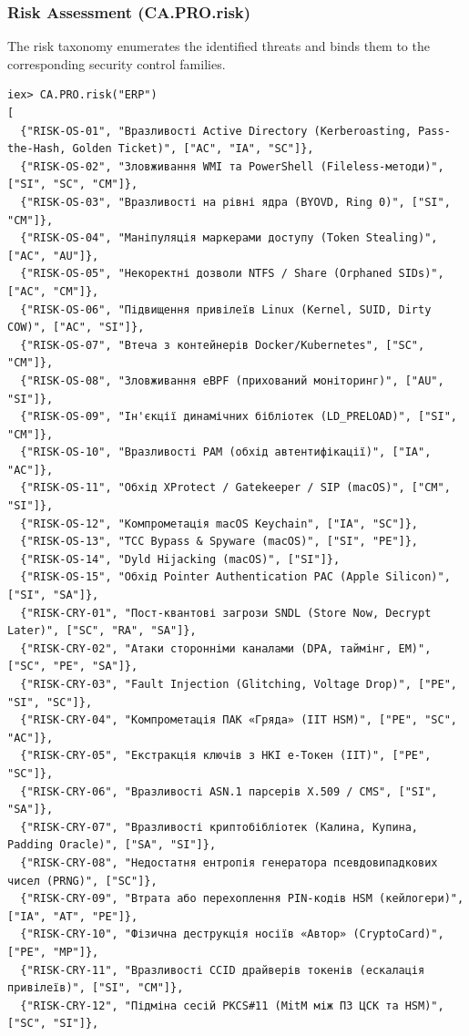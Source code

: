 \documentclass{article}
\begin{document}
\subsubsection{Risk Assessment (CA.PRO.risk)}
The risk taxonomy enumerates the identified threats and binds them to the corresponding security control families.
{\scriptsize
{}
\begin{verbatim}
iex> CA.PRO.risk("ERP")
[
  {"RISK-OS-01", "Вразливості Active Directory (Kerberoasting, Pass-the-Hash, Golden Ticket)", ["AC", "IA", "SC"]},
  {"RISK-OS-02", "Зловживання WMI та PowerShell (Fileless-методи)", ["SI", "SC", "CM"]},
  {"RISK-OS-03", "Вразливості на рівні ядра (BYOVD, Ring 0)", ["SI", "CM"]},
  {"RISK-OS-04", "Маніпуляція маркерами доступу (Token Stealing)", ["AC", "AU"]},
  {"RISK-OS-05", "Некоректні дозволи NTFS / Share (Orphaned SIDs)", ["AC", "CM"]},
  {"RISK-OS-06", "Підвищення привілеїв Linux (Kernel, SUID, Dirty COW)", ["AC", "SI"]},
  {"RISK-OS-07", "Втеча з контейнерів Docker/Kubernetes", ["SC", "CM"]},
  {"RISK-OS-08", "Зловживання eBPF (прихований моніторинг)", ["AU", "SI"]},
  {"RISK-OS-09", "Ін'єкції динамічних бібліотек (LD_PRELOAD)", ["SI", "CM"]},
  {"RISK-OS-10", "Вразливості PAM (обхід автентифікації)", ["IA", "AC"]},
  {"RISK-OS-11", "Обхід XProtect / Gatekeeper / SIP (macOS)", ["CM", "SI"]},
  {"RISK-OS-12", "Компрометація macOS Keychain", ["IA", "SC"]},
  {"RISK-OS-13", "TCC Bypass & Spyware (macOS)", ["SI", "PE"]},
  {"RISK-OS-14", "Dyld Hijacking (macOS)", ["SI"]},
  {"RISK-OS-15", "Обхід Pointer Authentication PAC (Apple Silicon)", ["SI", "SA"]},
  {"RISK-CRY-01", "Пост-квантові загрози SNDL (Store Now, Decrypt Later)", ["SC", "RA", "SA"]},
  {"RISK-CRY-02", "Атаки сторонніми каналами (DPA, таймінг, EM)", ["SC", "PE", "SA"]},
  {"RISK-CRY-03", "Fault Injection (Glitching, Voltage Drop)", ["PE", "SI", "SC"]},
  {"RISK-CRY-04", "Компрометація ПАК «Гряда» (ІІТ HSM)", ["PE", "SC", "AC"]},
  {"RISK-CRY-05", "Екстракція ключів з НКІ е-Токен (ІІТ)", ["PE", "SC"]},
  {"RISK-CRY-06", "Вразливості ASN.1 парсерів X.509 / CMS", ["SI", "SA"]},
  {"RISK-CRY-07", "Вразливості криптобібліотек (Калина, Купина, Padding Oracle)", ["SA", "SI"]},
  {"RISK-CRY-08", "Недостатня ентропія генератора псевдовипадкових чисел (PRNG)", ["SC"]},
  {"RISK-CRY-09", "Втрата або перехоплення PIN-кодів HSM (кейлогери)", ["IA", "AT", "PE"]},
  {"RISK-CRY-10", "Фізична деструкція носіїв «Автор» (CryptoCard)", ["PE", "MP"]},
  {"RISK-CRY-11", "Вразливості CCID драйверів токенів (ескалація привілеїв)", ["SI", "CM"]},
  {"RISK-CRY-12", "Підміна сесій PKCS#11 (MitM між ПЗ ЦСК та HSM)", ["SC", "SI"]},

\end{verbatim}}
\end{document}
